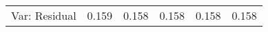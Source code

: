 \begin{center}
\begin{scriptsize}
\begin{ThreePartTable}
\begin{longtable}{l D{.}{.}{4.5} D{.}{.}{4.5} D{.}{.}{4.5} D{.}{.}{4.5} D{.}{.}{4.5}}
Var: Residual                                             & 0.159                   & 0.158                   & 0.158                   & 0.158                   & 0.158                   \\
\end{longtable}
\end{ThreePartTable}
\end{scriptsize}
\end{center}

